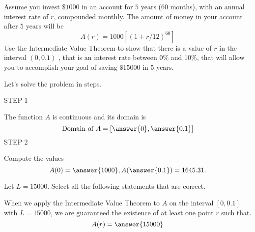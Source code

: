 \documentclass{ximera}
\author{Nela Lakos }
\begin{document}
\begin{exercise}
Assume you invest   $\$1000$ in an account for $5$ years ($60$ months), with an annual interest rate of $r$, compounded monthly.
The amount of money in your account after $5$ years will be
\[
A(r)=1000[(1+r/12)^60]
\]
Use the Intermediate Value Theorem to show that there is a value of $r$ in the interval $(0,0.1)$ , that is an interest rate between $0\%$ and $10\%$,
that will allow you to accomplish your goal of saving $\$15000$ in $5$ years.

Let's solve the problem in steps.

STEP 1

The function $A$ is continuous and its domain is
\[
\text{Domain of }A=[\answer{0},\answer{0.1}]
\] 
STEP 2

\begin{exercise}

Compute the values
\[
A(0)=\answer{1000},
A(\answer{0.1})=1645.31.
\]

\end{exercise}

\begin{exercise}
 Let $L=15000$. Select all the following statements that are correct.

\begin{selectAll}
\end{selectAll}

\end{exercise}
When we apply the Intermediate Value Theorem to $A$ on the interval $\left[0,0.1\right]$ with $L=15000$, we are guaranteed the existence of at least one point $r$ such that.
\[
A(r)=\answer{15000}
\]
\end{exercise}
\end{document}

